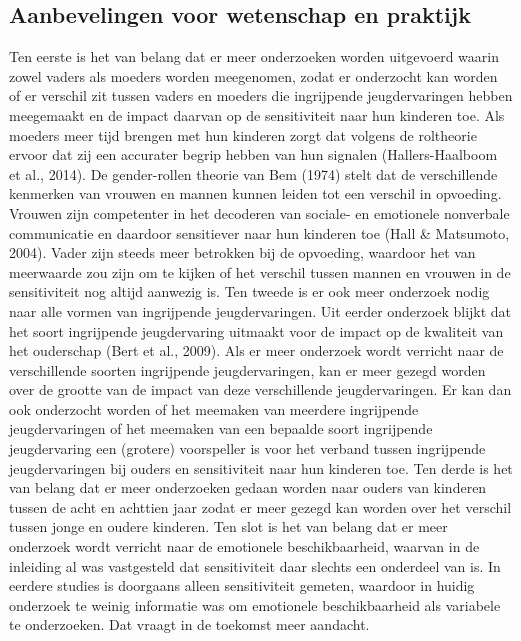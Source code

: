\documentclass[12pt]{article}
\begin{document}
\subsection{Aanbevelingen voor wetenschap en
praktijk}\label{aanbevelingen-voor-wetenschap-en-praktijk}

Ten eerste is het van belang dat er meer onderzoeken worden uitgevoerd
waarin zowel vaders als moeders worden meegenomen, zodat er onderzocht
kan worden of er verschil zit tussen vaders en moeders die ingrijpende
jeugdervaringen hebben meegemaakt en de impact daarvan op de
sensitiviteit naar hun kinderen toe. Als moeders meer tijd brengen met
hun kinderen zorgt dat volgens de roltheorie ervoor dat zij een
accurater begrip hebben van hun signalen (Hallers-Haalboom et al.,
2014). De gender-rollen theorie van Bem (1974) stelt dat de
verschillende kenmerken van vrouwen en mannen kunnen leiden tot een
verschil in opvoeding. Vrouwen zijn competenter in het decoderen van
sociale- en emotionele nonverbale communicatie en daardoor sensitiever
naar hun kinderen toe (Hall \& Matsumoto, 2004). Vader zijn steeds meer
betrokken bij de opvoeding, waardoor het van meerwaarde zou zijn om te
kijken of het verschil tussen mannen en vrouwen in de sensitiviteit nog
altijd aanwezig is. Ten tweede is er ook meer onderzoek nodig naar alle
vormen van ingrijpende jeugdervaringen. Uit eerder onderzoek blijkt dat
het soort ingrijpende jeugdervaring uitmaakt voor de impact op de
kwaliteit van het ouderschap (Bert et al., 2009). Als er meer onderzoek
wordt verricht naar de verschillende soorten ingrijpende
jeugdervaringen, kan er meer gezegd worden over de grootte van de impact
van deze verschillende jeugdervaringen. Er kan dan ook onderzocht worden
of het meemaken van meerdere ingrijpende jeugdervaringen of het meemaken
van een bepaalde soort ingrijpende jeugdervaring een (grotere)
voorspeller is voor het verband tussen ingrijpende jeugdervaringen bij
ouders en sensitiviteit naar hun kinderen toe. Ten derde is het van
belang dat er meer onderzoeken gedaan worden naar ouders van kinderen
tussen de acht en achttien jaar zodat er meer gezegd kan worden over het
verschil tussen jonge en oudere kinderen. Ten slot is het van belang dat
er meer onderzoek wordt verricht naar de emotionele beschikbaarheid,
waarvan in de inleiding al was vastgesteld dat sensitiviteit daar
slechts een onderdeel van is. In eerdere studies is doorgaans alleen
sensitiviteit gemeten, waardoor in huidig onderzoek te weinig informatie
was om emotionele beschikbaarheid als variabele te onderzoeken. Dat
vraagt in de toekomst meer aandacht.
\end{document}
